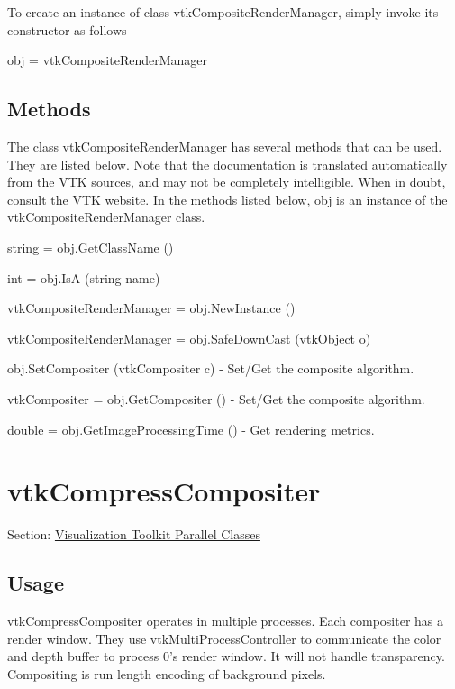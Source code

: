 To create an instance of class vtk\-Composite\-Render\-Manager, simply invoke its constructor as follows \begin{DoxyVerb}  obj = vtkCompositeRenderManager
\end{DoxyVerb}
 \hypertarget{vtkwidgets_vtkxyplotwidget_Methods}{}\subsection{Methods}\label{vtkwidgets_vtkxyplotwidget_Methods}
The class vtk\-Composite\-Render\-Manager has several methods that can be used. They are listed below. Note that the documentation is translated automatically from the V\-T\-K sources, and may not be completely intelligible. When in doubt, consult the V\-T\-K website. In the methods listed below, {\ttfamily obj} is an instance of the vtk\-Composite\-Render\-Manager class. 
\begin{DoxyItemize}
\item {\ttfamily string = obj.\-Get\-Class\-Name ()}  
\item {\ttfamily int = obj.\-Is\-A (string name)}  
\item {\ttfamily vtk\-Composite\-Render\-Manager = obj.\-New\-Instance ()}  
\item {\ttfamily vtk\-Composite\-Render\-Manager = obj.\-Safe\-Down\-Cast (vtk\-Object o)}  
\item {\ttfamily obj.\-Set\-Compositer (vtk\-Compositer c)} -\/ Set/\-Get the composite algorithm.  
\item {\ttfamily vtk\-Compositer = obj.\-Get\-Compositer ()} -\/ Set/\-Get the composite algorithm.  
\item {\ttfamily double = obj.\-Get\-Image\-Processing\-Time ()} -\/ Get rendering metrics.  
\end{DoxyItemize}\hypertarget{vtkparallel_vtkcompresscompositer}{}\section{vtk\-Compress\-Compositer}\label{vtkparallel_vtkcompresscompositer}
Section\-: \hyperlink{sec_vtkparallel}{Visualization Toolkit Parallel Classes} \hypertarget{vtkwidgets_vtkxyplotwidget_Usage}{}\subsection{Usage}\label{vtkwidgets_vtkxyplotwidget_Usage}
vtk\-Compress\-Compositer operates in multiple processes. Each compositer has a render window. They use vtk\-Multi\-Process\-Controller to communicate the color and depth buffer to process 0's render window. It will not handle transparency. Compositing is run length encoding of background pixels.

